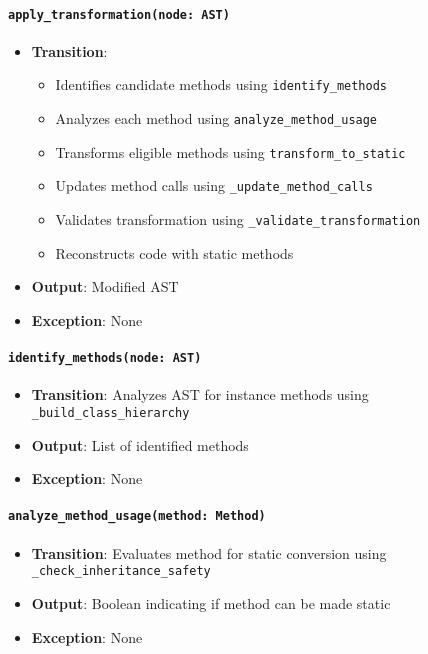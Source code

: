 \documentclass[12pt, titlepage]{article}
\begin{document}
\paragraph{\texttt{apply\_transformation(node: AST)}}
\begin{itemize}
  \item \textbf{Transition}:
    \begin{itemize}
      \item Identifies candidate methods using \texttt{identify\_methods}
      \item Analyzes each method using \texttt{analyze\_method\_usage}
      \item Transforms eligible methods using \texttt{transform\_to\_static}
      \item Updates method calls using \texttt{\_update\_method\_calls}
      \item Validates transformation using \texttt{\_validate\_transformation}
      \item Reconstructs code with static methods
    \end{itemize}
  \item \textbf{Output}: Modified AST
  \item \textbf{Exception}: None
\end{itemize}

\paragraph{\texttt{identify\_methods(node: AST)}}
\begin{itemize}
  \item \textbf{Transition}: Analyzes AST for instance methods using \texttt{\_build\_class\_hierarchy}
  \item \textbf{Output}: List of identified methods
  \item \textbf{Exception}: None
\end{itemize}

\paragraph{\texttt{analyze\_method\_usage(method: Method)}}
\begin{itemize}
  \item \textbf{Transition}: Evaluates method for static conversion using \texttt{\_check\_inheritance\_safety}
  \item \textbf{Output}: Boolean indicating if method can be made static
  \item \textbf{Exception}: None
\end{itemize}
\end{document}
